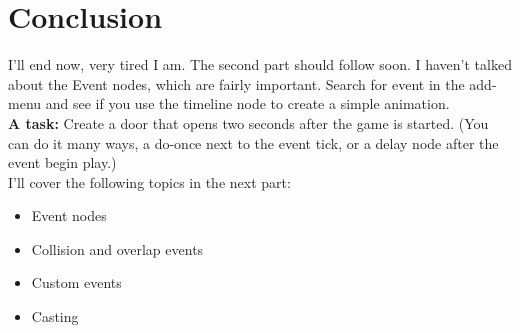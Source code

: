 \documentclass{article}
\begin{document}
\section{Conclusion}
I'll end now, very tired I am. The second part should follow soon. I haven't talked about the Event nodes, which are fairly important. Search for event in the add-menu and see if you use the timeline node to create a simple animation.
\\[10pt]
\textbf{A task:} Create a door that opens two seconds after the game is started. (You can do it many ways, a do-once next to the event tick, or a delay node after the event begin play.)
\\[10pt]
I'll cover the following topics in the next part:
\begin{itemize}
    \item Event nodes
    \item Collision and overlap events
    \item Custom events
    \item Casting
\end{itemize}
\end{document}
